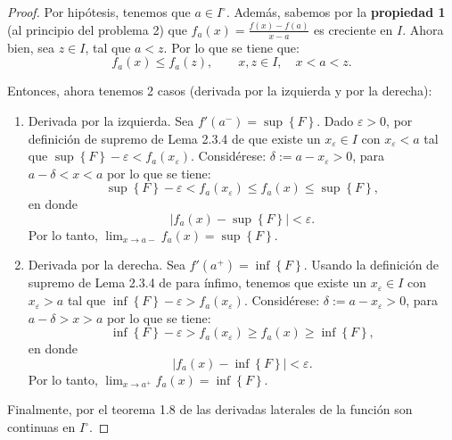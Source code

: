 \begin{proof}
	Por hipótesis, tenemos que $a\in I^{\circ}$. Además, sabemos por la \textbf{propiedad 1} (al principio del problema 2) que $f_a(x)=\frac{f(x)-f(a)}{x-a}$ es creciente en $I$. Ahora bien, sea $z\in I$, tal que $a<z$. Por lo que se tiene que: 
	$$f_a(x)\leq f_a(z), \qquad x,z\in I, \quad x<a<z.$$
	
	
	
Entonces, ahora tenemos 2 casos (derivada por la izquierda y por la derecha):
\begin{enumerate}
	\item Derivada por la izquierda. Sea $f'(a^-)= \sup\left\{F\right\}$. Dado $\varepsilon>0$, por definición de supremo de Lema 2.3.4 de \cite{bartle2000introduction} que existe un  $x_{\varepsilon} \in I$ con $x_{\varepsilon}<a$ tal que $\sup\left\{F\right\}-\varepsilon<f_{a}\left(x_{\varepsilon}\right).$ Considérese: $\delta:=a-x_{\varepsilon}>0$, para $a-\delta<x<a$ por lo que se tiene: $$\sup\left\{F\right\}-\varepsilon<f_{a}\left(x_{\varepsilon}\right) \leq f_{a}(x) \leq \sup\left\{F\right\},$$ en donde $$\left|f_{a}(x)-\sup\left\{F\right\}\right|<\varepsilon .$$ 
	Por lo tanto, $\lim _{x \rightarrow a-} f_{a}(x)=\sup\left\{F\right\}$. 
	\item Derivada por la derecha. Sea $f'(a^+)= \inf\left\{F\right\}$. Usando la definición de supremo de Lema 2.3.4 de \cite{bartle2000introduction} para ínfimo, tenemos que existe un  $x_{\varepsilon} \in I$ con $x_{\varepsilon}>a$ tal que $\inf\left\{F\right\}-\varepsilon>f_{a}\left(x_{\varepsilon}\right).$ Considérese: $\delta:=a-x_{\varepsilon}>0$, para $a-\delta>x>a$ por lo que se tiene: $$\inf\left\{F\right\}-\varepsilon>f_{a}\left(x_{\varepsilon}\right) \geq f_{a}(x) \geq \inf\left\{F\right\},$$ en donde $$\left|f_{a}(x)-\inf\left\{F\right\}\right|<\varepsilon .$$ 
	Por lo tanto, $\lim _{x \rightarrow a^+} f_{a}(x)=\inf\left\{F\right\}$. 
\end{enumerate}
Finalmente, por el teorema  1.8 de \cite{tiel1984convex} las derivadas laterales de la función son continuas en $I^{\circ}$. 
	
\end{proof}